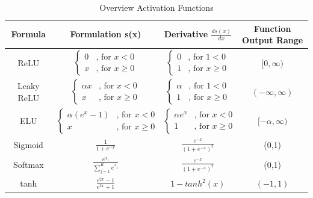 \begin {table}[H]
\begin{tabular}{ c c c c }
\toprule 
Formula & Formulation s(x) & Derivative $\frac{ds(x)}{dx}$ & Function Output Range \\
\midrule 
ReLU &   $\begin{cases} 0 & \text{, for }x < 0\\
	x & \text{, for }x \geqslant 0 \end{cases}$ & $\begin{cases} 0 & \text{, for }1 < 0\\
	1 & \text{, for }x \geqslant 0 \end{cases}$ & $[ 0, \infty)$\\

\rule{0pt}{5ex}%

Leaky ReLU &   $\begin{cases} \alpha x & \text{, for }x < 0\\
	x & \text{, for }x \geqslant 0 \end{cases}$ & $\begin{cases} \alpha & \text{, for }1 < 0\\
	1 & \text{, for }x \geqslant 0 \end{cases}$ & $(- \infty, \infty)$\\

\rule{0pt}{5ex}%

ELU &   $\begin{cases} \alpha(e^{x} - 1) & \text{, for }x < 0\\
	x & \text{, for }x \geqslant 0 \end{cases}$ & $\begin{cases} \alpha e^{x} & \text{, for }x < 0\\
	1 & \text{, for }x \geqslant 0 \end{cases}$ & $[ -\alpha, \infty)$\\
	
\rule{0pt}{5ex}%
	
Sigmoid & $\frac{1}{1+e^{-x}}$ & $\frac{e^{-x}}{(1+e^{-x})^{2}}$ & (0,1)\\

\rule{0pt}{5ex}%

Softmax & $\frac{e^{x_{i}}}{\sum_{j=1}^{K} e^{x_{j}}}$ & $\frac{e^{-x}}{(1+e^{-x})^{2}}$ & (0,1)\\

\rule{0pt}{5ex}%

tanh & $\frac{e^{2x}-1}{e^{2x}+1}$ & $1-tanh^{2}(x)$ & $(-1,1)$ \\
\bottomrule  

\end{tabular}
\caption {Overview Activation Functions} \label{tab:activation_functions}
\end {table}
